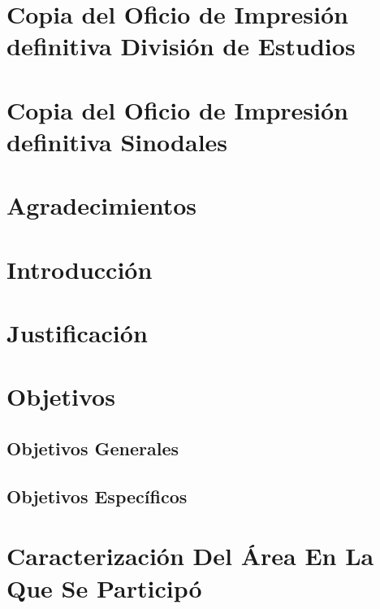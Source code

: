 \documentclass[a4paper,12pt, listof=totoc]{report}
\author{
  Fernando Garcia Corona\\
  \texttt{https://github.com/FerCorona/crown}
}
\begin{document}
	
	
	
	\citep{einstein} 
	
	\chapter* {Copia del Oficio de Impresión definitiva División de Estudios }
	
	\chapter* {Copia del Oficio de Impresión definitiva Sinodales}
	
	\chapter* {Agradecimientos }
	
	\tableofcontents
		
		\listoffigures
		
		\chapter {Introducción}
			
			
		\chapter {Justificación }
			
		
		\chapter {Objetivos }
			\section {Objetivos Generales}
				
			
			\section {Objetivos Específicos} 
				
		
		\chapter {Caracterización Del Área En La Que Se Participó  }
			
		
\end{document}
